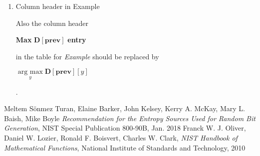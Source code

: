 ﻿\documentclass[a4paper,xelatex,english]{bxjsreport}
\newcommand\mib[1]{\boldsymbol{#1}}
\newcommand{\argmax}{\mathop{\textrm{arg~max}}\limits}
\begin{document}
\begin{enumerate}
\item Column header in Example

Also the column header 
\begin{shadebox}
\begin{algorithmic}
\State \textbf{Max} ${\mib{D}}[{\mib{prev}}]$ \textbf{entry}
\end{algorithmic}
\end{shadebox}
 in the table for \textit{Example} should be replaced by 
\begin{shadebox}
\begin{algorithmic}
\State $\argmax_{y} {\mib{D}}[{\mib{prev}}][y]$
\end{algorithmic}
\end{shadebox}
.
\end{enumerate}


\begin{thebibliography}{99}
Meltem S\"{o}nmez Turan,
Elaine Barker,
John Kelsey,
Kerry A. McKay,
Mary L. Baish,
Mike Boyle
\textit{Recommendation for the Entropy Sources Used for Random Bit Generation},
NIST Special Publication 800-90B, Jan. 2018
Franck W. J. Oliver,
Daniel W. Lozier,
Ronald F. Boisvert,
Charles W. Clark,
\textit{NIST Handbook of Mathematical Functions},
National Institute of Standards and Technology, 2010

\end{thebibliography}
\end{document}
